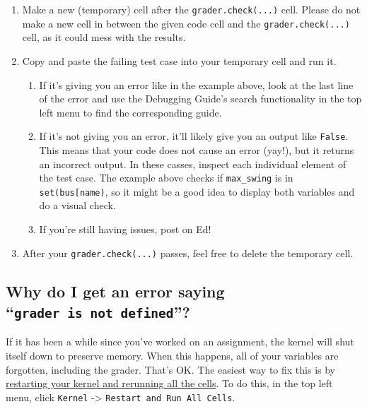 \documentclass[
  letterpaper,
  DIV=11,
  numbers=noendperiod]{scrreprt}
\providecommand{\tightlist}{%
  \setlength{\itemsep}{0pt}\setlength{\parskip}{0pt}}\usepackage{longtable,booktabs,array}
\begin{document}
\begin{enumerate}
\def\labelenumi{\arabic{enumi}.}
\item
  Make a new (temporary) cell after the \texttt{grader.check(...)} cell.
  Please do not make a new cell in between the given code cell and the
  \texttt{grader.check(...)} cell, as it could mess with the results.
\item
  Copy and paste the failing test case into your temporary cell and run
  it.

  \begin{enumerate}
  \def\labelenumii{\alph{enumii}.}
  \tightlist
  \item
    If it's giving you an error like in the example above, look at the
    last line of the error and use the Debugging Guide's search
    functionality in the top left menu to find the corresponding guide.
  \item
    If it's not giving you an error, it'll likely give you an output
    like \texttt{False}. This means that your code does not cause an
    error (yay!), but it returns an incorrect output. In these casses,
    inspect each individual element of the test case. The example above
    checks if \texttt{max\_swing} is in
    \texttt{set(bus{[}\textquotesingle{}name\textquotesingle{}{]})}, so
    it might be a good idea to display both variables and do a visual
    check.
  \item
    If you're still having issues, post on Ed!
  \end{enumerate}
\item
  After your \texttt{grader.check(...)} passes, feel free to delete the
  temporary cell.
\end{enumerate}

\subsection{\texorpdfstring{Why do I get an error saying
``\texttt{grader\ is\ not\ defined}''?}{Why do I get an error saying ``grader is not defined''?}}\label{why-do-i-get-an-error-saying-grader-is-not-defined}

If it has been a while since you've worked on an assignment, the kernel
will shut itself down to preserve memory. When this happens, all of your
variables are forgotten, including the grader. That's OK. The easiest
way to fix this is by
\href{https://ds100.org/debugging-guide/jupyter101/jupyter101.html\#restarting-kernel}{restarting
your kernel and rerunning all the cells}. To do this, in the top left
menu, click \texttt{Kernel} -\textgreater{}
\texttt{Restart\ and\ Run\ All\ Cells}.
\end{document}
